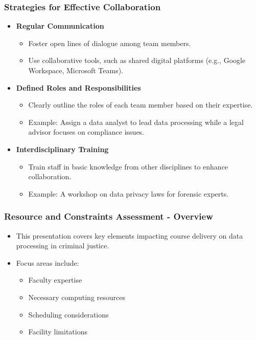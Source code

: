 \documentclass[aspectratio=169]{beamer}
\begin{document}
\begin{frame}[fragile]
    \frametitle{Strategies for Effective Collaboration}

    \begin{itemize}
        \item \textbf{Regular Communication}
            \begin{itemize}
                \item Foster open lines of dialogue among team members.
                \item Use collaborative tools, such as shared digital platforms (e.g., Google Workspace, Microsoft Teams).
            \end{itemize}
        \item \textbf{Defined Roles and Responsibilities}
            \begin{itemize}
                \item Clearly outline the roles of each team member based on their expertise.
                \item Example: Assign a data analyst to lead data processing while a legal advisor focuses on compliance issues.
            \end{itemize}
        \item \textbf{Interdisciplinary Training}
            \begin{itemize}
                \item Train staff in basic knowledge from other disciplines to enhance collaboration.
                \item Example: A workshop on data privacy laws for forensic experts.
            \end{itemize}
    \end{itemize}
\end{frame}

\begin{frame}[fragile]
    \frametitle{Resource and Constraints Assessment - Overview}
    \begin{itemize}
        \item This presentation covers key elements impacting course delivery on data processing in criminal justice.
        \item Focus areas include:
        \begin{itemize}
            \item Faculty expertise
            \item Necessary computing resources
            \item Scheduling considerations
            \item Facility limitations
        \end{itemize}
    \end{itemize}
\end{frame}
\end{document}

